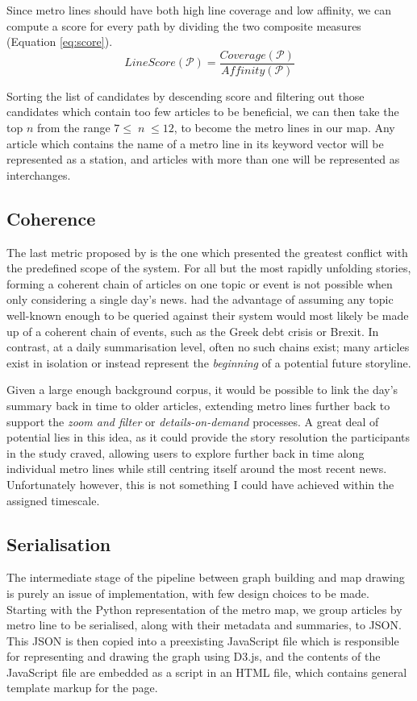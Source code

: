Since metro lines should have both high line coverage and low affinity, we can compute a score for every path by dividing the two composite measures (Equation \ref{eq:score}).
\begin{equation}
	LineScore(\mathcal{P}) = \frac{Coverage(\mathcal{P})}{Affinity(\mathcal{P})}
	\label{eq:score}
\end{equation}

Sorting the list of candidates by descending score and filtering out those candidates which contain too few articles to be beneficial, we can then take the top $n$ from the range $7 \leq\;n\;\leq 12$, to become the metro lines in our map. Any article which contains the name of a metro line in its keyword vector will be represented as a station, and articles with more than one will be represented as interchanges.

\subsection{Coherence}
The last metric proposed by \citeauthor{GeneratingInformationMaps} is the one which presented the greatest conflict with the predefined scope of the system. For all but the most rapidly unfolding stories, forming a coherent chain of articles on one topic or event is not possible when only considering a single day's news. \citeauthor{GeneratingInformationMaps} had the advantage of assuming any topic well-known enough to be queried against their system would most likely be made up of a coherent chain of events, such as the Greek debt crisis or Brexit. In contrast, at a daily summarisation level, often no such chains exist; many articles exist in isolation or instead represent the \textit{beginning} of a potential future storyline. 

Given a large enough background corpus, it would be possible to link the day's summary back in time to older articles, extending metro lines further back to support the \textit{zoom and filter} or \textit{details-on-demand} processes. A great deal of potential lies in this idea, as it could provide the story resolution the participants in the \cite{anewmodelfornews} study craved, allowing users to explore further back in time along individual metro lines while still centring itself around the most recent news. Unfortunately however, this is not something I could have achieved within the assigned timescale. 


\subsection{Serialisation}
The intermediate stage of the pipeline between graph building and map drawing is purely an issue of implementation, with few design choices to be made. Starting with the Python representation of the metro map, we group articles by metro line to be serialised, along with their metadata and summaries, to JSON. This JSON is then copied into a preexisting JavaScript file which is responsible for representing and drawing the graph using D3.js, and the contents of the JavaScript file are embedded as a script in an HTML file, which contains general template markup for the page. 

